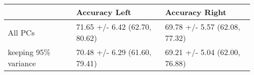 \begin{tabular}{lll}
\toprule
{} &                  Accuracy Left &                 Accuracy Right \\
\midrule
All PCs              &  71.65 +/- 6.42 (62.70, 80.62) &  69.78 +/- 5.57 (62.08, 77.32) \\
keeping 95\% variance &  70.48 +/- 6.29 (61.60, 79.41) &  69.21 +/- 5.04 (62.00, 76.88) \\
\bottomrule
\end{tabular}
